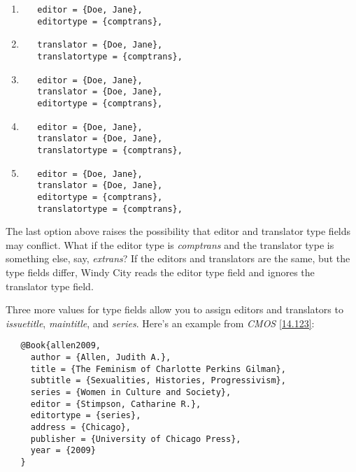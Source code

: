 \documentclass[11pt,letterpaper,oneside]{article}
\begin{document}
\begin{enumerate}[itemsep=0.2\baselineskip]

\item

\begin{verbatim}
   editor = {Doe, Jane},
   editortype = {comptrans},
\end{verbatim}

\item

\begin{verbatim}
   translator = {Doe, Jane},
   translatortype = {comptrans},
\end{verbatim}

\item

\begin{verbatim}
   editor = {Doe, Jane},
   translator = {Doe, Jane},
   editortype = {comptrans},
\end{verbatim}

\item

\begin{verbatim}
   editor = {Doe, Jane},
   translator = {Doe, Jane},
   translatortype = {comptrans},
\end{verbatim}

\item

\begin{verbatim}
   editor = {Doe, Jane},
   translator = {Doe, Jane},
   editortype = {comptrans},
   translatortype = {comptrans},
\end{verbatim}

\end{enumerate}

The last option above raises the possibility that editor and
translator type fields may conflict. What if the editor type is
\textit{comptrans} and the translator type is something else, say,
\textit{extrans}? If the editors and translators are the same, but the
type fields differ, Windy City reads the editor type field and ignores
the translator type field.

Three more values for type fields allow you to assign editors and
translators to \textit{issuetitle}, \textit{maintitle}, and
\textit{series}. Here's an example from \textit{CMOS} \ref{14.123}:

\begin{verbatim}
   @Book{allen2009,
     author = {Allen, Judith A.},
     title = {The Feminism of Charlotte Perkins Gilman},
     subtitle = {Sexualities, Histories, Progressivism},
     series = {Women in Culture and Society},
     editor = {Stimpson, Catharine R.},
     editortype = {series},
     address = {Chicago},
     publisher = {University of Chicago Press},
     year = {2009}
   }
\end{verbatim}
\end{document}
